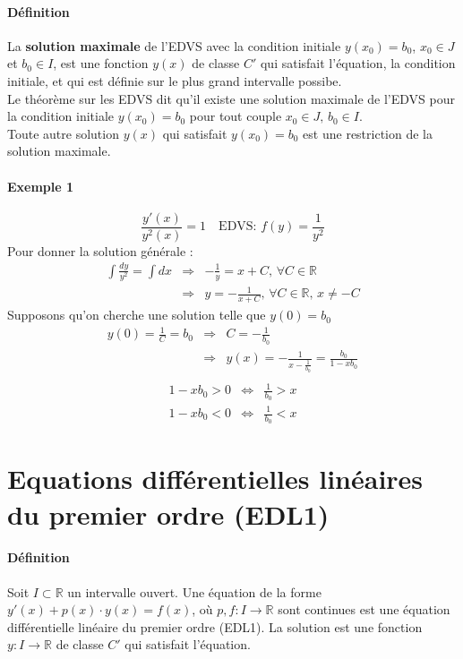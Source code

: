 \message{ !name(analyse-02.tex)}\documentclass[1Opt]{report}
\begin{document}
\paragraph{Définition}
La \textbf{solution maximale} de l'EDVS avec la condition initiale $y(x_0)=b_0$,
$x_0\in J$ et $b_0\in I$, est une fonction $y(x)$ de classe $C'$ qui satisfait
l'équation, la condition initiale, et qui est définie sur le plus grand
intervalle possibe.\\
Le théorème sur les EDVS dit qu'il existe une solution maximale de l'EDVS pour
la condition initiale $y(x_0)=b_0$ pour tout couple $x_0\in J,\,b_0\in I$.\\
Toute autre solution $y(x)$ qui satisfait $y(x_0)=b_0$ est une restriction de
la solution maximale.

\paragraph{Exemple 1}
\[ \frac{y'(x)}{y^2(x)}=1 \quad \mbox{EDVS: }f(y)=\frac{1}{y^2} \]
Pour donner la solution générale :
\begin{eqnarray*}
  \int{\frac{dy}{y^2}}=\int{dx} & \Rightarrow & -\frac{1}{y}=x+C,\,\forall C\in{\mathbb R} \\
  & \Rightarrow & y=-\frac{1}{x+C},\,\forall C\in{\mathbb R},\,x\neq -C
\end{eqnarray*}
Supposons qu'on cherche une solution telle que $y(0)=b_0$
\begin{eqnarray*}
  y(0)=\frac{1}{C}=b_0 & \Rightarrow & C=-\frac{1}{b_0} \\
  & \Rightarrow & y(x)=-\frac{1}{x-\frac{1}{b_0}}=\frac{b_0}{1-xb_0} \\
\end{eqnarray*}
\begin{eqnarray*}
  1-xb_0>0 & \Leftrightarrow & \frac{1}{b_0}>x \\
  1-xb_0<0 & \Leftrightarrow & \frac{1}{b_0}<x
\end{eqnarray*}



\section{Equations différentielles linéaires du premier ordre (EDL1)}


\paragraph{Définition}
Soit $I\subset{\mathbb R}$ un intervalle ouvert. Une équation de la forme
$y'(x)+p(x)\cdot y(x)=f(x)$, où $p,f:I\rightarrow{\mathbb R}$ sont continues est
une équation différentielle linéaire du premier ordre (EDL1). La solution est
une fonction $y:I\rightarrow{\mathbb R}$ de classe $C'$ qui satisfait
l'équation.
\end{document}

